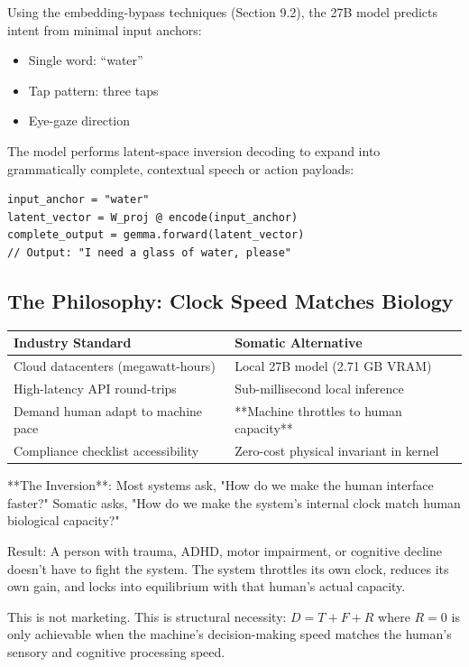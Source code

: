 \documentclass[11pt,oneside]{article}
\theoremstyle{definition}
\begin{document}
Using the embedding-bypass techniques (Section 9.2), the 27B model predicts intent from minimal input anchors:

\begin{itemize}
  \item Single word: ``water''
  \item Tap pattern: three taps
  \item Eye-gaze direction
\end{itemize}

The model performs latent-space inversion decoding to expand into grammatically complete, contextual speech or action payloads:

\begin{lstlisting}
input_anchor = "water"
latent_vector = W_proj @ encode(input_anchor)
complete_output = gemma.forward(latent_vector)
// Output: "I need a glass of water, please"
\end{lstlisting}

\subsection{The Philosophy: Clock Speed Matches Biology}

\begin{center}
\begin{tabular}{ll}
\toprule
\textbf{Industry Standard} & \textbf{Somatic Alternative} \\
\midrule
Cloud datacenters (megawatt-hours) & Local 27B model (2.71 GB VRAM) \\
High-latency API round-trips & Sub-millisecond local inference \\
Demand human adapt to machine pace & **Machine throttles to human capacity** \\
Compliance checklist accessibility & Zero-cost physical invariant in kernel \\
\toprule
\end{tabular}
\end{center}

**The Inversion**: Most systems ask, "How do we make the human interface faster?" Somatic asks, "How do we make the system's internal clock match human biological capacity?"

Result: A person with trauma, ADHD, motor impairment, or cognitive decline doesn't have to fight the system. The system throttles its own clock, reduces its own gain, and locks into equilibrium with that human's actual capacity.

This is not marketing. This is structural necessity: $D = T + F + R$ where $R = 0$ is only achievable when the machine's decision-making speed matches the human's sensory and cognitive processing speed.
\end{document}
